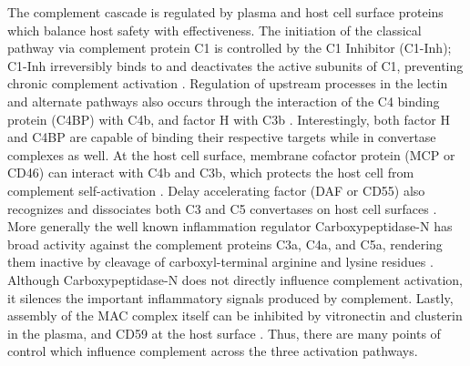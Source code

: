 \documentclass[12pt]{article}
\begin{document}
The complement cascade is regulated by plasma and host cell surface proteins which balance host safety with effectiveness.
The initiation of the classical pathway via complement protein C1 is controlled by the C1 Inhibitor (C1-Inh);
C1-Inh irreversibly binds to and deactivates the active subunits of C1, preventing chronic complement activation \cite{walker1995complement}.
Regulation of upstream processes in the lectin and alternate pathways also occurs through the interaction of the C4 binding protein (C4BP) with C4b, and factor H with C3b \cite{blom2001structural}. Interestingly,
both factor H and C4BP are capable of binding their respective targets while in convertase complexes as well.
At the host cell surface, membrane cofactor protein (MCP or CD46) can interact with C4b and C3b, which protects the host cell from complement self-activation \cite{riley2004cd46}.
Delay accelerating factor (DAF or CD55) also recognizes and dissociates both C3 and C5 convertases on host cell surfaces \cite{lukacik2004complement}.
More generally the well known inflammation regulator Carboxypeptidase-N has broad activity against the complement proteins C3a, C4a, and C5a, rendering them inactive by cleavage of carboxyl-terminal arginine and lysine residues \cite{liszewski1995control}.
Although Carboxypeptidase-N does not directly influence complement activation, it silences the important inflammatory signals produced by complement.
Lastly, assembly of the MAC complex itself can be inhibited by vitronectin and clusterin in the plasma, and CD59 at the host surface \cite{chauhan2006presence,zewde2016quantitative}.
Thus, there are many points of control which influence complement across the three activation pathways.
\end{document}
